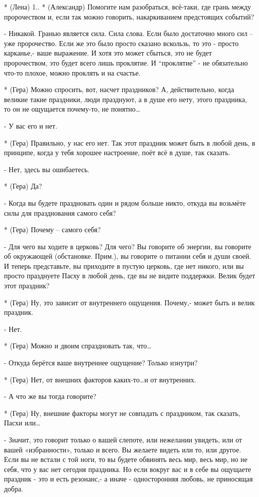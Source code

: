 * (Лена) 1..
* (Александр) Помогите нам разобраться, всё-таки, где грань между пророчеством и, если так можно говорить, накаркиванием предстоящих событий?

- Никакой.  Гранью является сила. Сила слова.  Если было достаточно много сил – уже пророчество. Если же это было просто сказано вскользь, то это - просто карканье,-  ваше выражение. И хотя это может сбыться, это не будет пророчеством, это будет всего лишь проклятие. И “проклятие” -  не обязательно что-то плохое, можно проклять и на счастье.

* (Гера) Можно спросить, вот, насчет праздников? А, действительно, когда великие такие праздники, люди празднуют, а в душе его нету, этого праздника, то он не ощущается почему-то, не понятно…

- У вас его и нет. 

* (Гера) Правильно, у нас его нет. Так этот праздник может быть в любой день, в принципе, когда у тебя хорошее настроение, поёт всё в душе, так сказать.

- Нет, здесь вы ошибаетесь. 

* (Гера) Да?

- Когда вы будете праздновать один и рядом больше никто, откуда вы возьмёте силы для празднования самого себя?

* (Гера) Почему – самого себя?

- Для чего вы ходите в церковь? Для чего? Вы говорите об энергии, вы говорите об окружающей (обстановке. Прим.), вы говорите о питании себя и души своей.  И теперь представьте, вы приходите в пустую церковь, где нет никого, или вы просто празднуете Пасху в любой день, где вы не видите поддержки. Велик будет этот праздник?

* (Гера) Ну, это зависит от внутреннего ощущения. Почему,- может быть и велик праздник.

- Нет.

* (Гера) Можно и двоим спраздновать так, что…

- Откуда берётся ваше внутреннее ощущение? Только изнутри?

* (Гера) Нет, от внешних факторов каких-то…и от внутренних.

- А что же вы тогда говорите?

* (Гера) Ну, внешние факторы могут не совпадать с праздником, так сказать, Пасхи или…

- Значит, это говорит только о вашей слепоте, или нежелании увидеть, или от вашей «избранности», только и всего. Вы желаете видеть или то, или другое. Если вы не встали с той ноги, то вы будете обвинять весь мир, весь мир, но не себя, что у вас нет сегодня праздника. Но если вокруг вас и в себе вы ощущаете праздник  - это и есть резонанс,- а иначе - односторонняя любовь, не приносящая добра.

